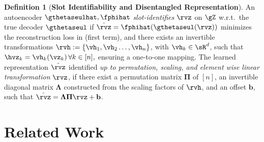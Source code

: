 \documentclass{article} %
\theoremstyle{plain}
\theoremstyle{definition}
\newtheorem{definition}[theorem]{Definition}
\theoremstyle{remark}
\numberwithin{equation}{section}
\begin{document}
\begin{definition}[\bf Slot Identifiability and Disentangled Representation]\label{def:disentanglement}
An autoencoder $\gthetaseulhat, \fphihat $ \textit{slot-identifies} $\rvz $ on $\gZ $ w.r.t.~the true decoder $\gthetaseul $ if $\hat{\rvz} = \fphihat(\gthetaseul(\rvz)) $ minimizes the reconstruction loss in  (first term), and there exists an invertible transformations $\rvh:=\{\vh_1,\vh_2 \dots, \vh_n\}$, with $\vh_{k} \in \sR^{d}$, such that $\hvz_k = \vh_k(\vz_{k})\, \forall k \in [n],$ ensuring a one-to-one mapping. The learned representation $\hat{\rvz}$ identified \emph{up to permutation, scaling, and element wise linear transformation} $\rvz$, if there exist a permutation matrix $\mathbf{\Pi}$ of $[n]$, an invertible diagonal matrix $\boldsymbol{\Lambda}$ constructed from the scaling factors of $\rvh$, and an offset $\mathbf{b}$, such that $\hat{\rvz} = \boldsymbol{\Lambda} \mathbf{\Pi} \rvz + \mathbf{b}$. 
\end{definition}

\section{Related Work}\label{sec:related_work}
\end{document}
